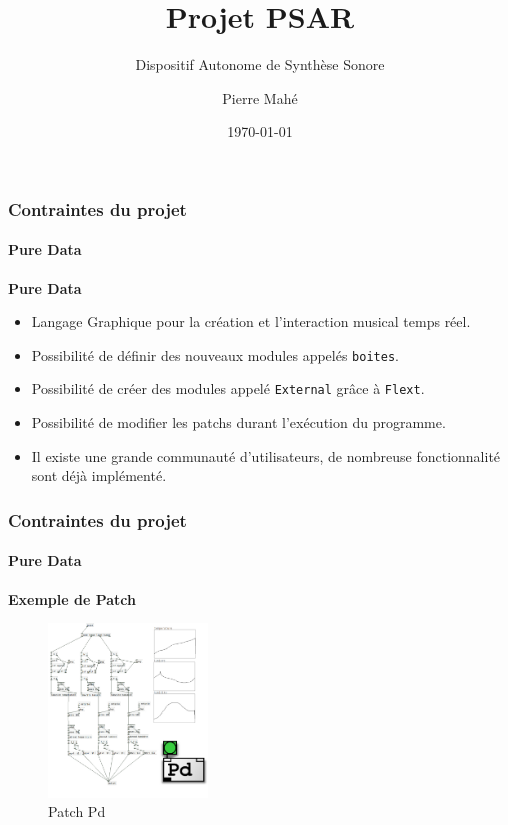 \documentclass{beamer}
\title{Projet PSAR}
\subtitle{Dispositif Autonome de Synthèse Sonore}
\institute{Encadrant : Hugues Genevois}
\author{Pierre Mahé}
\date{\today}
\begin{document}
\begin{frame}
\titlepage
\end{frame}


\begin{frame}
\frametitle{Contraintes du projet}
\framesubtitle{Pure Data}
\textbf{Pure Data}
\begin{itemize}
\item Langage Graphique pour la création et l'interaction musical temps réel.
\item Possibilité de définir des nouveaux modules appelés \texttt{boites}.
\item Possibilité de créer des modules appelé \texttt{External} grâce à \texttt{Flext}.
\item Possibilité de modifier les patchs durant l’exécution du programme.
\item Il existe une grande communauté d'utilisateurs, de nombreuse fonctionnalité sont déjà implémenté.
\end{itemize}
\end{frame}

\begin{frame}
\frametitle{Contraintes du projet}
\framesubtitle{Pure Data}
\textbf{Exemple de Patch}
\begin{figure}
  \centering
  \includegraphics[width=160px]{pd.jpg} 
	\caption{Patch Pd}
\end{figure}
\end{frame}
\end{document}
